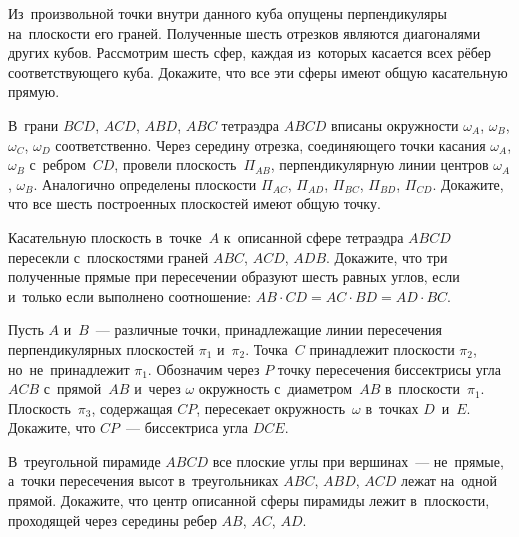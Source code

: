 


\begin{problems}

\item
Из~произвольной точки внутри данного куба опущены перпендикуляры на~плоскости
его граней.
Полученные шесть отрезков являются диагоналями других кубов.
Рассмотрим шесть сфер, каждая из~которых касается всех рёбер соответствующего
куба.
Докажите, что все эти сферы имеют общую касательную прямую.

\item
В~грани $BCD$, $ACD$, $ABD$, $ABC$ тетраэдра $ABCD$ вписаны окружности
$\omega_{A}$, $\omega_{B}$, $\omega_{C}$, $\omega_{D}$ соответственно.
Через середину отрезка, соединяющего точки касания $\omega_{A}$, $\omega_{B}$
с~ребром~$CD$, провели плоскость~$\Pi_{AB}$, перпендикулярную линии
центров $\omega_{A}$, $\omega_{B}$.
Аналогично определены
плоскости $\Pi_{AC}$, $\Pi_{AD}$, $\Pi_{BC}$, $\Pi_{BD}$, $\Pi_{CD}$.
Докажите, что все шесть построенных плоскостей имеют общую точку.

\item
Касательную плоскость в~точке~$A$ к~описанной сфере тетраэдра $ABCD$ пересекли
с~плоскостями граней $ABC$, $ACD$, $ADB$.
Докажите, что три полученные прямые при пересечении образуют шесть равных
углов, если и~только если выполнено соотношение:
\(
    AB \cdot CD = AC \cdot BD = AD \cdot BC
\).

\item
Пусть $A$ и~$B$~--- различные точки, принадлежащие линии пересечения
перпендикулярных плоскостей $\pi_{1}$ и~$\pi_{2}$.
Точка~$C$ принадлежит плоскости $\pi_{2}$, но~не~принадлежит $\pi_{1}$.
Обозначим через $P$ точку пересечения биссектрисы угла $ACB$ с~прямой~$AB$
и~через $\omega$ окружность с~диаметром~$AB$ в~плоскости~$\pi_{1}$.
Плоскость~$\pi_{3}$, содержащая $CP$, пересекает окружность~$\omega$
в~точках $D$~и~$E$.
Докажите, что $CP$~--- биссектриса угла $DCE$.

\item
В~треугольной пирамиде $ABCD$ все плоские углы при вершинах~--- не~прямые,
а~точки пересечения высот в~треугольниках $ABC$, $ABD$, $ACD$ лежат на~одной
прямой.
Докажите, что центр описанной сферы пирамиды лежит в~плоскости, проходящей
через середины ребер $AB$, $AC$, $AD$.


\end{problems}
